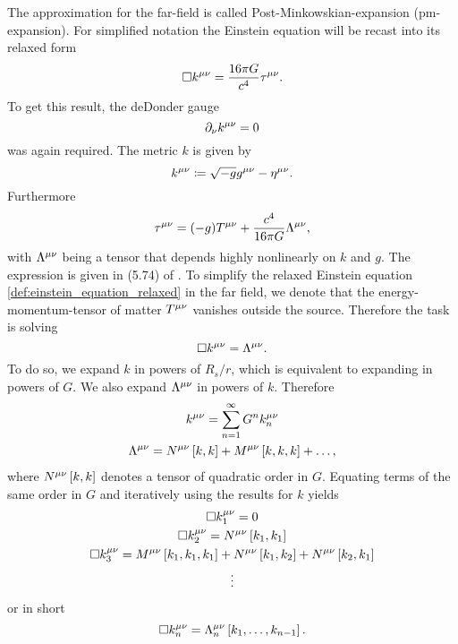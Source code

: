 The approximation for the far-field is called Post-Minkowskian-expansion (\gls{pm}-expansion). For simplified notation the Einstein equation will be recast into its relaxed form
\begin{equation}\label{def:einstein_equation_relaxed}
\Box k^{\mu\nu} = \frac{16\pi G}{c^4}\tau^{\mu\nu}.
\end{equation}
To get this result, the deDonder gauge
\begin{equation}
\partial_\nu k^{{\mu\nu}}=0
\end{equation}
was again required. The metric $k$ is given by
\begin{equation}
k^{\mu\nu}\coloneqq \sqrt{-g}g^{\mu\nu} -\eta^{\mu\nu}.
\end{equation}
Furthermore
\begin{equation}\label{def:pn_tau}
\tau^{\mu\nu} = {\left( -g \right)}T^{\mu\nu} + \frac{c^4}{16\pi G}\Lambda^{\mu\nu},
\end{equation}
with $\Lambda^{\mu\nu}$ being a tensor that depends highly nonlinearly on $k$ and $g$. The expression is given in (5.74) of \cite{gwv1}. To simplify the relaxed Einstein equation \eqref{def:einstein_equation_relaxed} in the far field, we denote that the energy-momentum-tensor of matter $T^{\mu\nu}$ vanishes outside the source. Therefore the task is solving
\begin{equation}
\Box k^{\mu\nu} = \Lambda^{\mu\nu}.
\end{equation}
To do so, we expand $k$ in powers of $R_s/r$, which is equivalent to expanding in powers of $G$. We also expand $\Lambda^{\mu\nu}$ in powers of $k$. Therefore
\begin{gather}
k^{\mu\nu}=\sum_{n=1}^\infty G^n k^{\mu\nu}_n\\
\Lambda^{\mu\nu} = N^{\mu\nu}\left[k,k\right] + M^{\mu\nu}\left[k,k,k\right]+\dotsc,
\end{gather}
where $N^{\mu\nu}\left[ k, k\right]$ denotes a tensor of quadratic order in $G$. Equating terms of the same order in $G$ and iteratively using the results for $k$ yields
\begin{gather}
\Box k^{\mu\nu}_1=0\\
\Box k^{\mu\nu}_2 = N^{\mu\nu}\left[k_1, k_1\right]\\
\Box k^{\mu\nu}_3 = M^{\mu\nu}\left[k_1, k_1, k_1\right]+N^{\mu\nu}\left[k_1,k_2\right]+N^{\mu\nu}\left[k_2,k_1\right]\\
\vdots\nonumber
\end{gather}
or in short
\begin{equation}\label{def:pm_wave_equation}
\Box k^{\mu\nu}_n=\Lambda^{\mu\nu}_n\left[k_1, \dotsc, k_{n-1}\right].
\end{equation}
